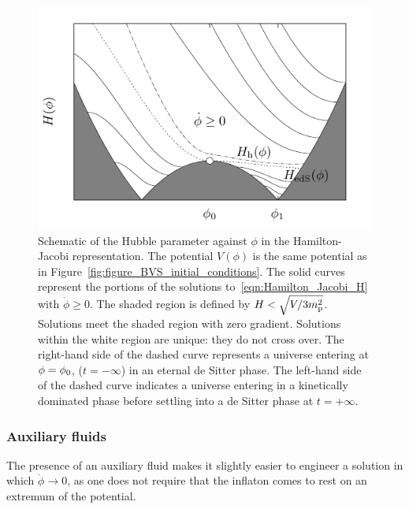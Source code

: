 \begin{figure}[tp]
  \includegraphics[width=\textwidth]{chapters/kinetic_dominance/figures/edS}
  \caption{Schematic of the Hubble parameter against \(\phi\) in the Hamilton-Jacobi representation. The potential \(V(\phi)\) is the same potential as in Figure~\protect\ref{fig:figure_BVS_initial_conditions}. The solid curves represent the portions of the solutions to~\protect\eqref{eqn:Hamilton_Jacobi_H} with \(\dot{\phi}\ge0\). The shaded region is defined by \(H<\sqrt{V/3m_{\mathrm{p}}^2}\). Solutions meet the shaded region with zero gradient. Solutions within the white region are unique: they do not cross over. The right-hand side of the dashed curve represents a universe entering at  \(\phi=\phi_0\), (\(t=-\infty\)) in an eternal de Sitter phase. The left-hand side of the dashed curve indicates a universe entering in a kinetically dominated phase before settling into a de Sitter phase at \(t=+\infty\).}\label{fig:figure_edS}
\end{figure}

\subsubsection{Auxiliary fluids}
The presence of an auxiliary fluid makes it slightly easier to engineer a solution in which \(\dot\phi\to0\), as one does not require that the inflaton comes to rest on an extremum of the potential.

